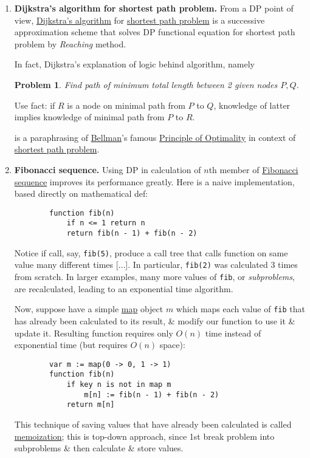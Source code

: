 \documentclass{article}
\newtheorem{problem}{Problem}
\begin{document}
\begin{enumerate}
	\item {\bf Dijkstra's algorithm for shortest path problem.} From a DP point of view, \href{https://en.wikipedia.org/wiki/Dijkstra%27s_algorithm}{Dijkstra's algorithm} for \href{https://en.wikipedia.org/wiki/Shortest_path_problem}{shortest path problem} is a successive approximation scheme that solves DP functional equation for shortest path problem by {\it Reaching} method.
	
	In fact, Dijkstra's explanation of logic behind algorithm, namely
	\begin{problem}
		Find path of minimum total length between 2 given nodes $P,Q$.
	\end{problem}
	Use fact: if $R$ is a node on minimal path from $P$ to $Q$, knowledge of latter implies knowledge of minimal path from $P$ to $R$.
	
	is a paraphrasing of \href{https://en.wikipedia.org/wiki/Richard_Bellman}{\sc Bellman}'s famous \href{https://en.wikipedia.org/wiki/Principle_of_Optimality}{Principle of Optimality} in context of \href{https://en.wikipedia.org/wiki/Shortest_path_problem}{shortest path problem}.
	\item {\bf Fibonacci sequence.} Using DP in calculation of $n$th member of \href{https://en.wikipedia.org/wiki/Fibonacci_sequence}{Fibonacci sequence} improves its performance greatly. Here is a naive implementation, based directly on mathematical def:
	\begin{verbatim}
		function fib(n)
		    if n <= 1 return n
		    return fib(n - 1) + fib(n - 2)
	\end{verbatim}
	Notice if call, say, {\tt fib(5)}, produce a call tree that calls function on same value many different times [$\ldots$]. In particular, {\tt fib(2)} was calculated 3 times from scratch. In larger examples, many more values of {\tt fib}, or {\it subproblems}, are recalculated, leading to an exponential time algorithm.
	
	Now, suppose have a simple \href{https://en.wikipedia.org/wiki/Associative_array}{map} object $m$ which maps each value of {\tt fib} that has already been calculated to its result, \& modify our function to use it \& update it. Resulting function requires only $O(n)$ time instead of exponential time (but requires $O(n)$ space):
	\begin{verbatim}
		var m := map(0 -> 0, 1 -> 1)
		function fib(n)
		    if key n is not in map m
		        m[n] := fib(n - 1) + fib(n - 2)
		    return m[n]
	\end{verbatim}
	This technique of saving values that have already been calculated is called \href{https://en.wikipedia.org/wiki/Memoization}{memoization}; this is top-down approach, since 1st break problem into subproblems \& then calculate \& store values.
	

\end{enumerate}
\end{document}
